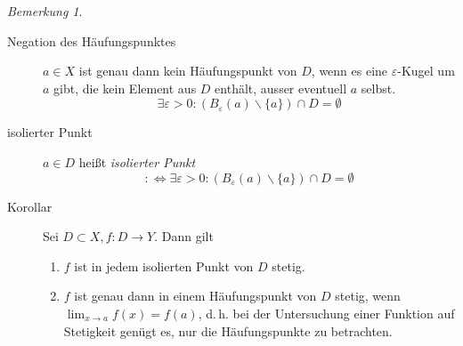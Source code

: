 \documentclass[ngerman,titlepage,twoside, parskip=half*]{scrreprt}
\newcommand*{\perdef}{:\Leftrightarrow}
\theoremstyle{plain}
\theoremstyle{definition}
\theoremstyle{remark}
\newtheorem*{remark}{Bemerkung}
\begin{document}
\begin{remark}
\begin{description}
\item[Negation des Häufungspunktes] $a\in X$ ist genau dann kein
  Häufungspunkt von $D$, wenn es eine $\varepsilon$-Kugel um $a$ gibt,
  die kein Element aus $D$ enthält, ausser eventuell $a$ selbst.
  \[\exists \varepsilon >0\colon(B_{\varepsilon}(a)\backslash \{a\})\cap D=\emptyset\]
\item[isolierter Punkt] $a\in D$ heißt \emph{isolierter
    Punkt}
  \[\perdef \exists \varepsilon>0\colon(B_{\varepsilon}(a)\backslash
  \{a\})\cap D=\emptyset\]
\item[Korollar] Sei $D\subset X, f\colon D\rightarrow Y$. Dann gilt
  \begin{enumerate}[i]
  \item $f$ ist in jedem isolierten Punkt von $D$ stetig.
  \item $f$ ist genau dann in einem Häufungspunkt von $D$ stetig, wenn
    $\lim_{x\rightarrow a}f(x)=f(a)$, d.\,h. bei der Untersuchung einer
    Funktion auf Stetigkeit genügt es, nur die Häufungspunkte zu
    betrachten.
  \end{enumerate}
\end{description}
\end{remark}
\end{document}
